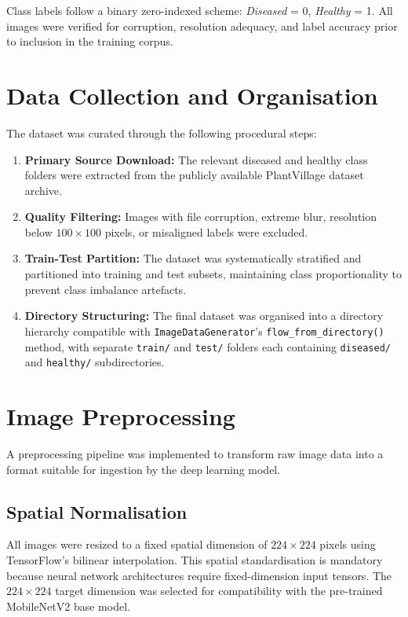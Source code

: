 \documentclass[12pt,a4paper]{report}
\begin{document}
\noindent Class labels follow a binary zero-indexed scheme: \textit{Diseased} = 0, \textit{Healthy} = 1. All images were verified for corruption, resolution adequacy, and label accuracy prior to inclusion in the training corpus.

\section{Data Collection and Organisation}

The dataset was curated through the following procedural steps:

\begin{enumerate}[label=\arabic*., itemsep=4pt]
    \item \textbf{Primary Source Download:} The relevant diseased and healthy class folders were extracted from the publicly available PlantVillage dataset archive.
    \item \textbf{Quality Filtering:} Images with file corruption, extreme blur, resolution below $100 \times 100$ pixels, or misaligned labels were excluded.
    \item \textbf{Train-Test Partition:} The dataset was systematically stratified and partitioned into training and test subsets, maintaining class proportionality to prevent class imbalance artefacts.
    \item \textbf{Directory Structuring:} The final dataset was organised into a directory hierarchy compatible with \texttt{ImageDataGenerator}'s \texttt{flow\_from\_directory()} method, with separate \texttt{train/} and \texttt{test/} folders each containing \texttt{diseased/} and \texttt{healthy/} subdirectories.
\end{enumerate}

\section{Image Preprocessing}

A preprocessing pipeline was implemented to transform raw image data into a format suitable for ingestion by the deep learning model.

\subsection{Spatial Normalisation}

All images were resized to a fixed spatial dimension of $224 \times 224$ pixels using TensorFlow's bilinear interpolation. This spatial standardisation is mandatory because neural network architectures require fixed-dimension input tensors. The $224 \times 224$ target dimension was selected for compatibility with the pre-trained MobileNetV2 base model.
\end{document}
